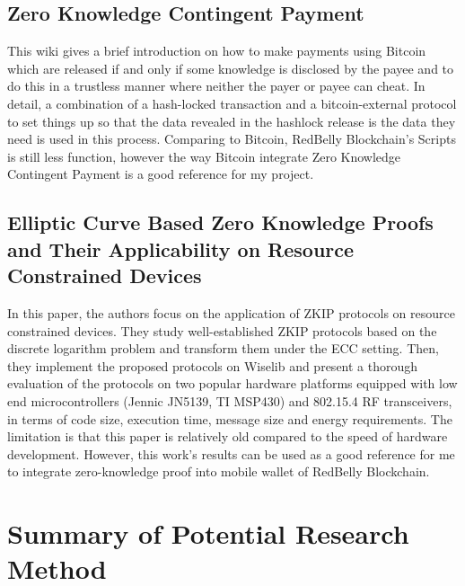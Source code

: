 \subsection{Zero Knowledge Contingent Payment\cite{wiki2011zero}}

This wiki gives a brief introduction on how to make payments using Bitcoin which are released 
if and only if some knowledge is disclosed by the payee and to do this in a trustless manner 
where neither the payer or payee can cheat. In detail, a combination of a hash-locked transaction 
and a bitcoin-external protocol to set things up so that the data revealed in the hashlock release
is the data they need is used in this process. Comparing to Bitcoin, RedBelly Blockchain's Scripts
is still less function, however the way Bitcoin integrate Zero Knowledge Contingent Payment is a
good reference for my project.

\subsection{Elliptic Curve Based Zero Knowledge Proofs and Their Applicability on Resource Constrained Devices\cite{ecc2011}}

In this paper, the authors focus on the application of ZKIP protocols on resource constrained 
devices. They study well-established ZKIP protocols based on the discrete logarithm problem and 
transform them under the ECC setting. Then, they implement the proposed protocols on Wiselib and 
present a thorough evaluation of the protocols on two popular hardware platforms equipped with 
low end microcontrollers (Jennic JN5139, TI MSP430) and 802.15.4 RF transceivers, 
in terms of code size, execution time, message size and energy requirements. The limitation is that
this paper is relatively old compared to the speed of hardware development. However, this work's 
results can be used as a good reference for me to integrate zero-knowledge proof into mobile wallet
of RedBelly Blockchain.

\section{Summary of Potential Research Method}



